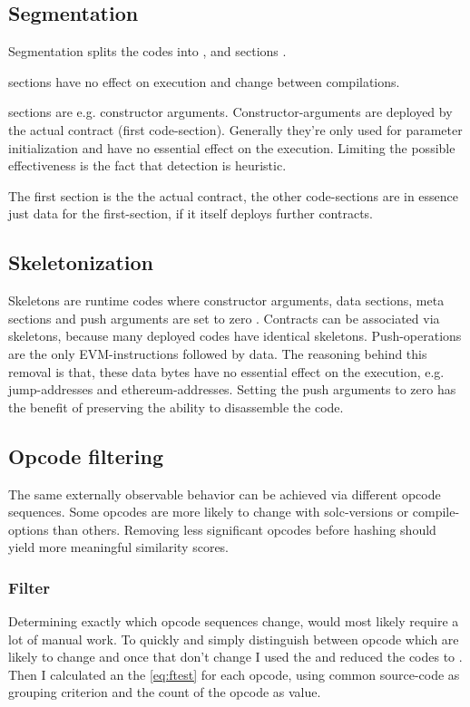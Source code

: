 \documentclass[../main.tex]{subfiles}
\begin{document}
\subsection{Segmentation}
Segmentation splits the codes into ,  and  sections .

 sections have no effect on execution and change between compilations.

 sections are e.g. constructor arguments.
Constructor-arguments are deployed by the actual contract (first code-section).
Generally they're only used for parameter initialization and have no essential effect on the execution.
Limiting the possible effectiveness is the fact that detection is heuristic.

The first  section is the the actual contract, the other code-sections are in essence just data for the first-section, if it itself deploys further contracts.

\subsection{Skeletonization}
Skeletons are runtime codes where constructor arguments, data sections, meta sections and push arguments are set to zero .
Contracts can be associated via skeletons, because many deployed codes have identical skeletons.
Push-operations are the only EVM-instructions followed by data.
The reasoning behind this removal is that, these data bytes have no essential effect on the execution, e.g. jump-addresses and ethereum-addresses.
Setting the push arguments to zero has the benefit of preserving the ability to disassemble the code.

\subsection{Opcode filtering}
The same externally observable behavior can be achieved via different opcode sequences.
Some opcodes are more likely to change with solc-versions or compile-options than others.
Removing less significant opcodes before hashing should yield more meaningful similarity scores.

\subsubsection{ Filter \cite{ethereum-contract-similarity}}
Determining exactly which opcode sequences change, would most likely require a lot of manual work.
To quickly and simply distinguish between opcode which are likely to change and once that don't change I used the  and reduced the codes to . Then I calculated an the  \eqref{eq:ftest} for each opcode, using common source-code as grouping criterion and the count of the opcode as value.
\end{document}
